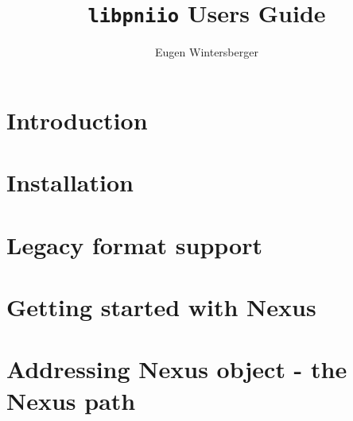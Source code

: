 \documentclass[a4paper,draft]{scrbook}
\title{{\Huge{\tt libpniio} Users Guide}}
\author{Eugen Wintersberger}
\begin{document}
\maketitle
\tableofcontents
\listoftodos

\chapter{Introduction}\label{chapter:introduction}

\FloatBarrier

\chapter{Installation}\label{chapter:installation}

\FloatBarrier

\chapter{Legacy format support}\label{chapter:legacy_formats}
\FloatBarrier

\chapter{Getting started with Nexus}\label{chapter:nexus_quickstart}

\FloatBarrier

\chapter{Addressing Nexus object - the Nexus path}

\FloatBarrier
\end{document}
